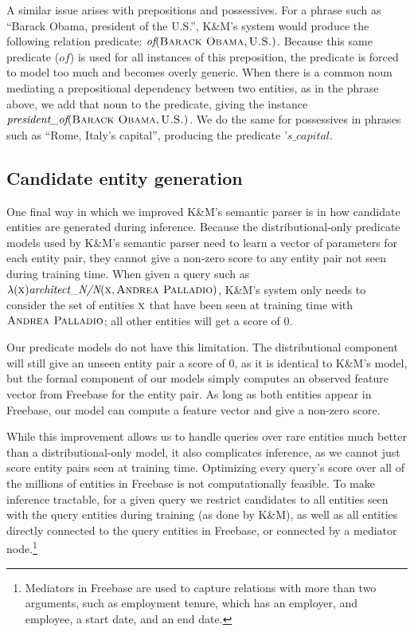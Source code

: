 \documentclass[11pt]{article}
\newcommand{\lexicalpredicate}[1]{\ensuremath{\textit{#1}}}
\newcommand{\entity}[1]{\ensuremath{\textsc{#1}}}
\begin{document}
A similar issue arises with prepositions and possessives.  For a phrase such as
``Barack Obama, president of the U.S.'', K\&M's system would produce the
following relation predicate: $\lexicalpredicate{of}(\entity{Barack Obama},
\entity{U.S.})$.  Because this same predicate (\lexicalpredicate{of}) is used for all
instances of this preposition, the predicate is forced to model too much and
becomes overly generic.  When there is a common noun mediating a prepositional
dependency between two entities, as in the phrase above, we add that noun to
the predicate, giving the instance $\lexicalpredicate{president\_of}(\entity{Barack
Obama}, \entity{U.S.})$.  We do the same for possessives in phrases such as
``Rome, Italy's capital'', producing the predicate \lexicalpredicate{'s\_capital}.

\subsection{Candidate entity generation}
\label{sec:better-candidates}

One final way in which we improved K\&M's semantic parser is in how candidate
entities are generated during inference.  Because the distributional-only
predicate models used by K\&M's semantic parser need to learn a vector of
parameters for each entity pair, they cannot give a non-zero score to any
entity pair not seen during training time.  When given a query such as
$\lambda(\entity{x}) \lexicalpredicate{architect\_N/N}(\entity{x}, \entity{Andrea
Palladio})$, K\&M's system only needs to consider the set of entities
$\entity{x}$ that have been seen at training time with \entity{Andrea
Palladio}; all other entities will get a score of 0.

Our predicate models do not have this limitation.  The distributional component
will still give an unseen entity pair a score of 0, as it is identical to K\&M's
model, but the formal component of our models simply computes an observed
feature vector from Freebase for the entity pair.  As long as both entities
appear in Freebase, our model can compute a feature vector and give a non-zero
score.

While this improvement allows us to handle queries over rare entities much
better than a distributional-only model, it also complicates inference, as we
cannot just score entity pairs seen at training time.  Optimizing every query's
score over all of the millions of entities in Freebase is not computationally
feasible.  To make inference tractable, for a given query we restrict
candidates to all entities seen with the query entities during training (as
done by K\&M), as well as all entities directly connected to the query entities
in Freebase, or connected by a mediator node.\footnote{Mediators in Freebase are
used to capture relations with more than two arguments, such as employment
tenure, which has an employer, and employee, a start date, and an end date.}
\end{document}
